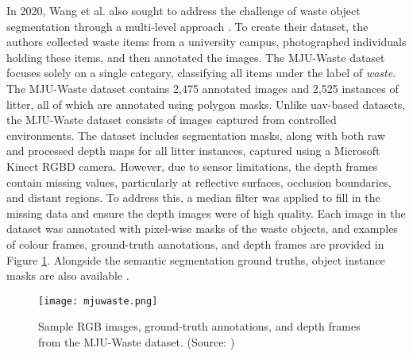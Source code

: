 In 2020, Wang et al. also sought to address the challenge of waste object segmentation through a multi-level approach \cite{mju_waste}. To create their dataset, the authors collected waste items from a university campus, photographed individuals holding these items, and then annotated the images. The MJU-Waste dataset focuses solely on a single category, classifying all items under the label of \textit{waste}. The MJU-Waste dataset contains 2,475 annotated images and 2,525 instances of litter, all of which are annotated using polygon masks.
Unlike \gls{uav}-based datasets, the MJU-Waste dataset consists of images captured from controlled environments. The dataset includes segmentation masks, along with both raw and processed depth maps for all litter instances, captured using a Microsoft Kinect RGBD camera. However, due to sensor limitations, the depth frames contain missing values, particularly at reflective surfaces, occlusion boundaries, and distant regions. To address this, a median filter was applied to fill in the missing data and ensure the depth images were of high quality. Each image in the dataset was annotated with pixel-wise masks of the waste objects, and examples of colour frames, ground-truth annotations, and depth frames are provided in Figure \ref{fig:mjuwaste}. Alongside the semantic segmentation ground truths, object instance masks are also available \cite{mju_waste}.

\begin{figure}[!htbp]
    \centering
    \texttt{[image: mjuwaste.png]}
    \caption{Sample RGB images, ground-truth annotations, and depth frames from the MJU-Waste dataset. (Source: \cite{mju_waste})}
    \label{fig:mjuwaste}
\end{figure}

